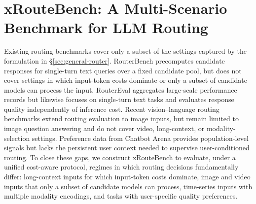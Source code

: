 \section{xRouteBench: A Multi-Scenario Benchmark for LLM Routing}
\label{sec:xroutebench}
Existing routing benchmarks cover only a subset of the settings captured by the formulation in \S\ref{sec:general-router}. RouterBench \citep{hu2024routerbench} precomputes candidate responses for single-turn text queries over a fixed candidate pool, but does not cover settings in which input-token costs dominate or only a subset of candidate models can process the input. RouterEval \citep{huang2025routereval} aggregates large-scale performance records but likewise focuses on single-turn text tasks and evaluates response quality independently of inference cost. Recent vision--language routing benchmarks \citep{huang2025vl, ma2026mmr} extend routing evaluation to image inputs, but remain limited to image question answering and do not cover video, long-context, or modality-selection settings. Preference data from Chatbot Arena \citep{zheng2023judging} provides population-level signals but lacks the persistent user context needed to supervise user-conditioned routing. To close these gaps, we construct xRouteBench to evaluate, under a unified cost-aware protocol, regimes in which routing decisions fundamentally differ: long-context inputs for which input-token costs dominate, image and video inputs that only a subset of candidate models can process, time-series inputs with multiple modality encodings, and tasks with user-specific quality preferences.

